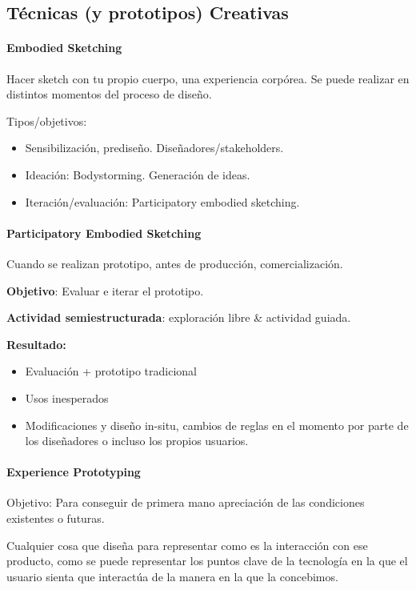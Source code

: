\documentclass[12pt, twoside, openright]{report} %
\begin{document}
\subsection{Técnicas (y prototipos) Creativas}
\paragraph{Embodied Sketching}
Hacer sketch con tu propio cuerpo, una experiencia corpórea. Se puede realizar en distintos momentos del proceso de diseño.

Tipos/objetivos:
\begin{itemize}
  \item Sensibilización, prediseño. Diseñadores/stakeholders.
  \item Ideación: Bodystorming. Generación de ideas.
  \item Iteración/evaluación: Participatory embodied sketching.
\end{itemize}

\paragraph{Participatory Embodied Sketching}
Cuando se realizan prototipo, antes de producción, comercialización.

\textbf{Objetivo}: Evaluar e iterar el prototipo.

\textbf{Actividad semiestructurada}: exploración libre \& actividad guiada.

\textbf{Resultado:}
\begin{itemize}
  \item Evaluación + prototipo tradicional
  \item Usos inesperados
  \item Modificaciones y diseño in-situ, cambios de reglas en el momento por parte de los diseñadores o incluso los propios usuarios.
\end{itemize}
  
\paragraph{Experience Prototyping}  
Objetivo: Para conseguir de primera mano apreciación de las condiciones existentes o futuras.

Cualquier cosa que diseña para representar como es la interacción con ese producto, como se puede representar los puntos clave de la tecnología en la que el usuario sienta que interactúa de la manera en la que la concebimos.
\end{document}
